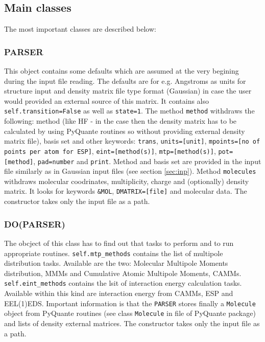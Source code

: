 \documentclass[a4paper,titlepage,twoside,fleqn]{article}
\begin{document}
\subsection{Main classes}

The most important classes are described below:

\subsubsection{PARSER}
This object contains some defaults which are assumed at the very begining
during the input file reading. The defaults are for e.g. Angstroms as units
for structure input and density matrix file type format (Gaussian) in case
the user would provided an external source of this matrix. It contains also
\verb+self.transition=False+ as well as \verb+state=1+. The method \verb+method+
withdraws the following: method (like HF - in the case then the density matrix
has to be calculated by using PyQuante routines so without providing external
density matrix file), basis set and other keywords: \verb+trans+, \verb+units=[unit]+, 
\verb+mpoints=[no of points per atom for ESP]+, \verb+eint=[method(s)]+, \verb+mtp=[method(s)]+,
\verb+pot=[method]+, \verb+pad=number+ and \verb+print+. Method and basis set are 
provided in the input file similarly as in Gaussian input files (see section \ref{sec:inp}).
Method \verb+molecules+ withdraws molecular coodrinates, multiplicity, charge 
and (optionally) density matrix. It looks for keywords \verb+&MOL+, \verb+DMATRIX=[file]+
and molecular data. The constructor takes only the input file as a path.

\subsubsection{DO(PARSER)}
The obcject of this class has to find out that tasks to perform
and to run appropriate routines. \verb+self.mtp_methods+ 
contains the list of multipole distribution tasks. Available are the two:
Molecular Multipole Moments distribution, MMMs and Cumulative Atomic
Multipole Moments, CAMMs. \verb+self.eint_methods+ contains the lsit
of interaction energy calculation tasks. Available within this kind are
interaction energy from CAMMs, ESP and EEL(1)EDS. Important information
is that the \verb+PARSER+ stores finally a \verb+Molecule+ object from 
PyQuante routines (see class \verb+Molecule+ in file of PyQuante package)
and lists of density external matrices. The constructor takes only the input 
file as a path.
\end{document}

